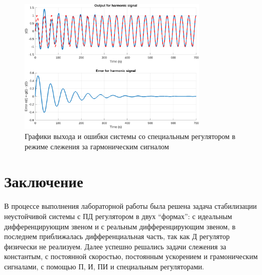\begin{figure}[H]
    \centering
    \includegraphics[width=0.8\textwidth]{figs/task_6_out_harmonic.png}
    \caption{Графики выхода и ошибки системы со специальным регулятором в режиме слежения за гармоническим сигналом}
    \label{fig:task_6_out}
\end{figure}



\section{Заключение}

В процессе выполнения лабораторной работы была решена задача стабилизации
неустойчивой системы с ПД регулятором в двух ``формах'': с идеальным дифференцирующим звеном
и с реальным дифференцирующим звеном, в последнем приближалась дифференциальная часть,
так как Д регулятор физически не реализуем. Далее успешно решались задачи слежения 
за константым, с постоянной скоростью, постоянным ускорением и грамоническим сигналами,
с помощью П, И, ПИ и специальным регуляторами. 



